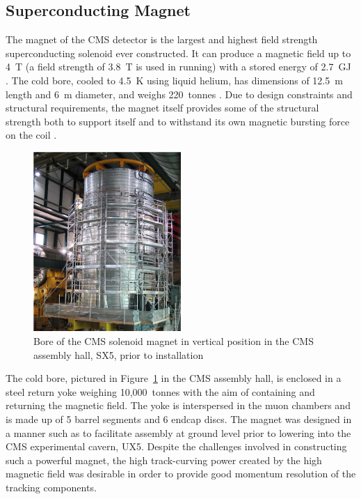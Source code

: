 \subsection{Superconducting Magnet}
\label{ss:Magnet}
The magnet of the CMS detector is the largest and highest field strength superconducting solenoid ever
constructed. It can produce a magnetic field up to 4~T (a field strength of 3.8~T is used in running) with a
stored energy of 2.7~GJ \cite{CMS_TDR1}. The cold bore, cooled to 4.5~K using liquid helium, has dimensions of
12.5~m length and 6~m diameter, and weighs 220~tonnes \cite{Cryogenic_System_for_Superconducting_Solenoid}.
Due to design constraints and structural requirements, the magnet itself provides some of the structural strength both to support itself and to
withstand its own magnetic bursting force on the coil \cite{CMS_experiment}.

\begin{figure}[hbtp]
   \centering
     \includegraphics[width=0.5\textwidth]{Chapters/03_Detector/Images/Cold_mass.png}\hfill
     \caption{Bore of the CMS solenoid magnet in vertical position in the CMS assembly hall, SX5, prior to
     installation \cite{CMS_experiment}}
     \label{fig:CMS_magnet_cold_bore}
\end{figure}
 
The cold bore, pictured in Figure~\ref{fig:CMS_magnet_cold_bore} in the CMS assembly hall, is enclosed in a
steel return yoke weighing 10,000~tonnes with the aim of containing and returning the magnetic field. The yoke is interspersed in the
muon chambers and is made up of 5 barrel segments and 6 endcap discs. The magnet was designed in a manner such
as to facilitate assembly at ground level prior to lowering into the CMS experimental cavern, UX5.
Despite the challenges involved in constructing such a powerful magnet, the high track-curving power created
by the high magnetic field was desirable in order to provide good momentum resolution of the tracking
components.

